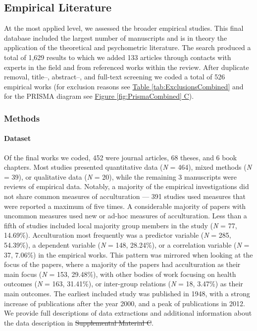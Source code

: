 \documentclass[man, 12pt, a4paper, mask]{apa7}
\newcommand{\fgrref}[2][]{\hyperref[#2]{Figure \ref*{#2}#1}}
\newcommand{\tblref}[2][]{\hyperref[#2]{Table \ref*{#2}#1}}
\newcommand{\siannotatedanalyses}{Supplemental Material B} %
\providecommand{\DIFaddtex}[1]{{\protect\color{blue}\uwave{#1}}} %
\providecommand{\DIFdeltex}[1]{{\protect\color{red}\sout{#1}}}                      %
\providecommand{\DIFaddbegin}{} %
\providecommand{\DIFaddend}{} %
\providecommand{\DIFdelbegin}{} %
\providecommand{\DIFdelend}{} %
\providecommand{\DIFadd}[1]{\texorpdfstring{\DIFaddtex{#1}}{#1}} %
\providecommand{\DIFdel}[1]{\texorpdfstring{\DIFdeltex{#1}}{}} %
\newcommand{\DIFscaledelfig}{0.5}
\newlength{\DIFdelgraphicswidth} %
\newlength{\DIFdelgraphicsheight} %
\newcommand{\DIFaddincludegraphics}[2][]{{\color{blue}\fbox{\DIFOincludegraphics[#1]{#2}}}} %
\newcommand{\DIFdelincludegraphics}[2][]{%
\sbox{\DIFdelgraphicsbox}{\DIFOincludegraphics[#1]{#2}}%
\settoboxwidth{\DIFdelgraphicswidth}{\DIFdelgraphicsbox} %
\settoboxtotalheight{\DIFdelgraphicsheight}{\DIFdelgraphicsbox} %
\scalebox{\DIFscaledelfig}{%
\parbox[b]{\DIFdelgraphicswidth}{\usebox{\DIFdelgraphicsbox}\\[-\baselineskip] \rule{\DIFdelgraphicswidth}{0em}}\llap{\resizebox{\DIFdelgraphicswidth}{\DIFdelgraphicsheight}{%
\setlength{\unitlength}{\DIFdelgraphicswidth}%
\begin{picture}(1,1)%
\thicklines\linethickness{2pt} %
{\color[rgb]{1,0,0}\put(0,0){\framebox(1,1){}}}%
{\color[rgb]{1,0,0}\put(0,0){\line( 1,1){1}}}%
{\color[rgb]{1,0,0}\put(0,1){\line(1,-1){1}}}%
\end{picture}%
}\hspace*{3pt}}} %
} %
\DeclareRobustCommand{\DIFaddbegin}{\DIFOaddbegin \let\includegraphics\DIFaddincludegraphics} %
\DeclareRobustCommand{\DIFaddend}{\DIFOaddend \let\includegraphics\DIFOincludegraphics} %
\DeclareRobustCommand{\DIFdelbegin}{\DIFOdelbegin \let\includegraphics\DIFdelincludegraphics} %
\DeclareRobustCommand{\DIFdelend}{\DIFOaddend \let\includegraphics\DIFOincludegraphics} %
\begin{document}
\subsection{Empirical Literature}

At the most applied level, we assessed the broader empirical studies.
This final database included the largest number of manuscripts and is in
theory the application of the theoretical and psychometric literature.
The search produced a total of 1,629 results to which we added 133
articles through contacts with experts in the field and from referenced
works within the review. After duplicate removal, title--, abstract--,
and full-text screening we coded a total of 526 empirical works (for
exclusion reasons see \tblref{tab:ExclusionsCombined} and for the PRISMA
diagram see \fgrref[ C]{fig:PrismaCombined}).

\subsubsection{Methods}

\paragraph{Dataset}

Of the final works we coded, 452 were journal articles, 68 theses, and 6
book chapters. Most studies presented quantitative data (\textit{N} =
464), mixed methods (\textit{N} = 39), or qualitative data (\textit{N} =
20), while the remaining 3 manuscripts were reviews of empirical data.
Notably, a majority of the empirical investigations did not share common
measures of acculturation --- 391 studies used measures that were
reported a maximum of five times. A considerable majority of papers with
uncommon measures used new or ad-hoc measures of acculturation. Less
than a fifth of studies included local majority group members in the
study (\textit{N} = 77, 14.69\%). Acculturation most frequently was a
predictor variable (\textit{N} = 285, 54.39\%), a dependent variable
(\textit{N} = 148, 28.24\%), or a correlation variable (\textit{N} = 37,
7.06\%) in the empirical works. This pattern was mirrored when looking
at the focus of the papers, where a majority of the papers had
acculturation as their main focus (\textit{N} = 153, 29.48\%), with
other bodies of work focusing on health outcomes (\textit{N} = 163,
31.41\%), or inter-group relations (\textit{N} = 18, 3.47\%) as their
main outcomes. The earliest included study was published in 1948, with a
strong increase of publications after the year 2000, and a peak of
publications in 2012. We provide full descriptions of data extractions
and additional information about the data description in
\DIFdelbegin \DIFdel{Supplemental
Material C}\DIFdelend \DIFaddbegin \DIFadd{\siannotatedanalyses}\DIFaddend .
\end{document}
